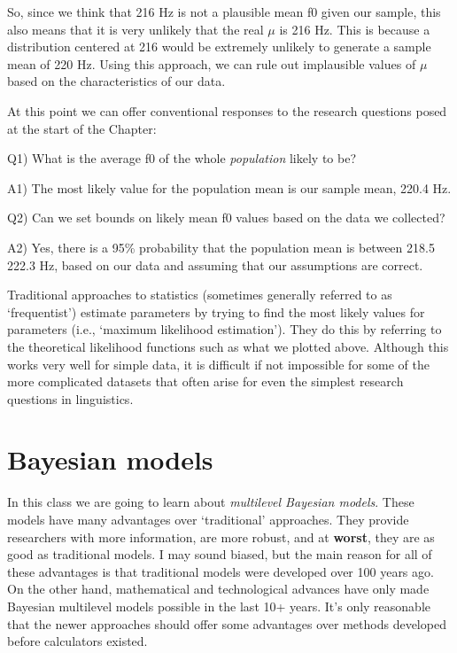 \documentclass[
]{book}
\begin{document}
So, since we think that 216 Hz is not a plausible mean f0 given our sample, this also means that it is very unlikely that the real \(\mu\) is 216 Hz. This is because a distribution centered at 216 would be extremely unlikely to generate a sample mean of 220 Hz. Using this approach, we can rule out implausible values of \(\mu\) based on the characteristics of our data.

At this point we can offer conventional responses to the research questions posed at the start of the Chapter:

Q1) What is the average f0 of the whole \emph{population} likely to be?

A1) The most likely value for the population mean is our sample mean, 220.4 Hz.

Q2) Can we set bounds on likely mean f0 values based on the data we collected?

A2) Yes, there is a 95\% probability that the population mean is between 218.5 222.3 Hz, based on our data and assuming that our assumptions are correct.

Traditional approaches to statistics (sometimes generally referred to as `frequentist') estimate parameters by trying to find the most likely values for parameters (i.e., `maximum likelihood estimation'). They do this by referring to the theoretical likelihood functions such as what we plotted above. Although this works very well for simple data, it is difficult if not impossible for some of the more complicated datasets that often arise for even the simplest research questions in linguistics.

\hypertarget{bayesian-models}{%
\section{Bayesian models}\label{bayesian-models}}

In this class we are going to learn about \emph{multilevel Bayesian models}. These models have many advantages over `traditional' approaches. They provide researchers with more information, are more robust, and at \textbf{worst}, they are as good as traditional models. I may sound biased, but the main reason for all of these advantages is that traditional models were developed over 100 years ago. On the other hand, mathematical and technological advances have only made Bayesian multilevel models possible in the last 10+ years. It's only reasonable that the newer approaches should offer some advantages over methods developed before calculators existed.
\end{document}

